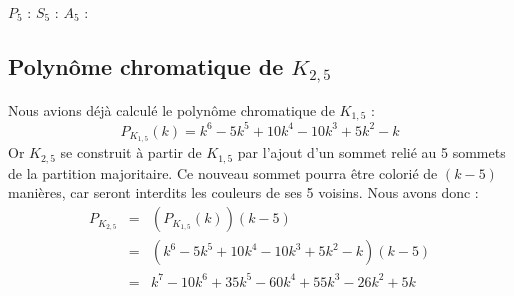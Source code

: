 \begin{center}
$P_5$ :  \hspace{1cm}
$S_5$ :  \hspace{1cm}
$A_5$ : 
\end{center}

\subsection{Polynôme chromatique de $K_{2,5}$}
Nous avions déjà calculé le polynôme chromatique de $K_{1,5}$ :
\[ P_{K_{1,5}}(k) = k^6 - 5k^5  + 10k^4 - 10k^3 + 5k^2 - k \]
Or $K_{2,5}$ se construit à partir de $K_{1,5}$ par l'ajout d'un sommet relié au 5 sommets de la partition majoritaire. Ce nouveau sommet pourra être colorié de $(k-5)$ manières, car seront interdits les couleurs de ses 5 voisins. Nous avons donc :
\begin{eqnarray*}
P_{K_{2,5}} & = &	(P_{K_{1,5}}(k))(k-5)								\\
			& = & 	(k^6 - 5k^5  + 10k^4 - 10k^3 + 5k^2 - k)(k-5)		\\	
			& = &	k^7 - 10k^6 + 35k^5 - 60k^4 + 55k^3 - 26k^2 + 5k	
\end{eqnarray*}

